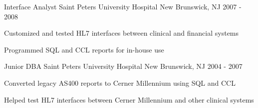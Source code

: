 \begin{cventries}
  \cventry
  {Interface Analyst} %
  {Saint Peters University Hospital} %
  {New Brunswick, NJ} %
  {2007 - 2008} %
  {
    \begin{cvitems} %
      \item {Customized and tested HL7 interfaces between clinical and financial systems}
      \item {Programmed SQL and CCL reports for in-house use}
    \end{cvitems}
  }

  \cventry
    {Junior DBA} %
    {Saint Peters University Hospital} %
    {New Brunswick, NJ} %
    {2004 - 2007} %
    {
      \begin{cvitems} %
        \item {Converted legacy AS400 reports to Cerner Millennium using SQL and CCL}
        \item {Helped test HL7 interfaces between Cerner Millennium and other clinical systems}
      \end{cvitems}
    }

\end{cventries}
